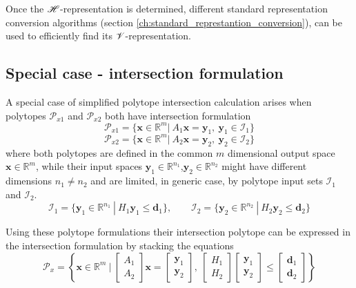 Once the $\mathscr{H}$-representation is determined, different standard representation conversion algorithms (section \ref{ch:standard_represtantion_conversion}), can be used to efficiently find its $\mathscr{V}$-representation.

\subsection{Special case - intersection formulation}

A special case of simplified polytope intersection calculation arises when polytopes $\mathcal{P}_{x1}$ and $\mathcal{P}_{x2}$ both have intersection formulation
\begin{equation}
    \mathcal{P}_{x1}=\{\bm{x}\in\mathbb{R}^m |~ A_1\bm{x} = \bm{y}_1,~\bm{y}_1 \in \mathcal{I}_1  \}
\end{equation}
\begin{equation}
    \mathcal{P}_{x2}=\{\bm{x}\in\mathbb{R}^m |~ A_2\bm{x} = \bm{y}_2,~\bm{y}_2 \in \mathcal{I}_2  \}
\end{equation}
where both polytopes are defined in the common $m$ dimensional output space $\bm{x}\in\mathbb{R}^m$, while their input spaces $\bm{y}_1\in\mathbb{R}^{n_1}$,$\bm{y}_2\in\mathbb{R}^{n_2}$ might have different dimensions $n_1\neq n_2$ and are limited, in generic case, by polytope input sets $\mathcal{I}_1$ and $\mathcal{I}_2$.
\begin{equation}
    \mathcal{I}_{1}=\{\bm{y}_1\in\mathbb{R}^{n_1} ~|~ H_1\bm{y}_1 \leq \bm{d}_1\}, \qquad
    \mathcal{I}_{2}=\{\bm{y}_2\in\mathbb{R}^{n_2} ~|~ H_2\bm{y}_2 \leq \bm{d}_2\}
\end{equation}

Using these polytope formulations their intersection polytope can be expressed in the intersection formulation by stacking the equations
\begin{equation}
    \mathcal{P}_{x}=\left\{\bm{x}\in\mathbb{R}^m ~\bigg|~ 
   \begin{bmatrix}
        A_1 \\
        A_2
    \end{bmatrix} \bm{x} = \begin{bmatrix}
        \bm{y}_1 \\
        \bm{y}_2
    \end{bmatrix}, ~\begin{bmatrix}
        H_1  \\
        H_2
    \end{bmatrix} \begin{bmatrix}
        \bm{y}_1 \\
        \bm{y}_2
    \end{bmatrix} \leq \begin{bmatrix}
        \bm{d}_1  \\
        \bm{d}_2
    \end{bmatrix} \right\}
\end{equation}


